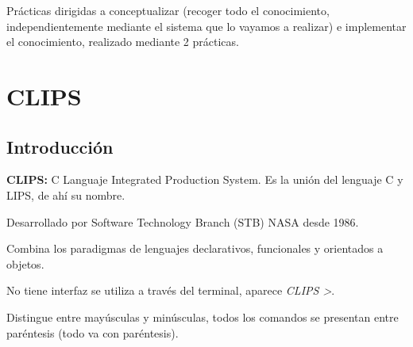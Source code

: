 \documentclass[12pt, twoside, openright]{report} %
\begin{document}
Prácticas dirigidas a conceptualizar (recoger todo el conocimiento, independientemente mediante el sistema que lo vayamos a realizar) e implementar el conocimiento, realizado mediante 2 prácticas.

\chapter{CLIPS}
\section{Introducción}
\textbf{CLIPS:} C Languaje Integrated Production System. Es la unión del lenguaje C y LIPS, de ahí su nombre.

Desarrollado por Software Technology Branch (STB) NASA desde 1986.

Combina los paradigmas de lenguajes declarativos, funcionales y orientados a objetos.

No tiene interfaz se utiliza a través del terminal, aparece \textit{CLIPS >}.

Distingue entre mayúsculas y minúsculas, todos los comandos se presentan entre paréntesis (todo va con paréntesis).
\end{document}

